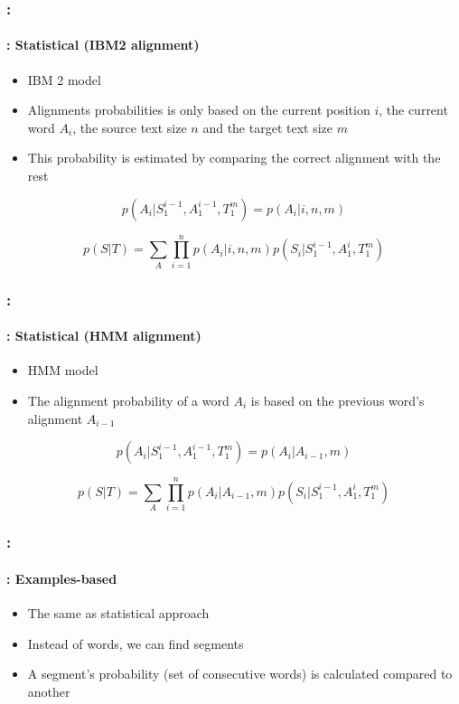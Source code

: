 \documentclass[xcolor=table]{beamer}
\begin{document}
\begin{frame}
	\frametitle{\insertshortsubtitle: \insertsection}
	\framesubtitle{\insertsubsection: Statistical (IBM2 alignment)}
	
	\begin{itemize}
		\item IBM 2 model
		\item Alignments probabilities is only based on the current position $i$, the current word $A_i$, the source text size $n$ and the target text size $m$
		\item This probability is estimated by comparing the correct alignment  with the rest
	\end{itemize}
	
	\[p(A_i | S_1^{i-1}, A_1^{i-1}, T_1^{m}) = p(A_i | i, n, m)\]
	
	\[p(S|T) = \sum_{A} \prod_{i=1}^{n} p(A_i | i, n, m) p(S_i | S_1^{i-1}, A_1^{i}, T_1^{m})\]
	
\end{frame}

\begin{frame}
	\frametitle{\insertshortsubtitle: \insertsection}
	\framesubtitle{\insertsubsection: Statistical (HMM alignment)}
	
	\begin{itemize}
		\item HMM model
		\item The alignment probability of a word $A_i$ is based on the previous word's alignment $A_{i-1}$
	\end{itemize}
	
	\[p(A_i | S_1^{i-1}, A_1^{i-1}, T_1^{m}) = p(A_i | A_{i-1}, m)\]
	
	\[p(S|T) = \sum_{A} \prod_{i=1}^{n} p(A_i | A_{i-1}, m) p(S_i | S_1^{i-1}, A_1^{i}, T_1^{m})\]
	
\end{frame}

\begin{frame}
	\frametitle{\insertshortsubtitle: \insertsection}
	\framesubtitle{\insertsubsection: Examples-based}
	
	\begin{itemize}
		\item The same as statistical approach
		\item Instead of words, we can find segments
		\item A segment's probability (set of consecutive words) is calculated compared to another
	\end{itemize}

\end{frame}
\end{document}
